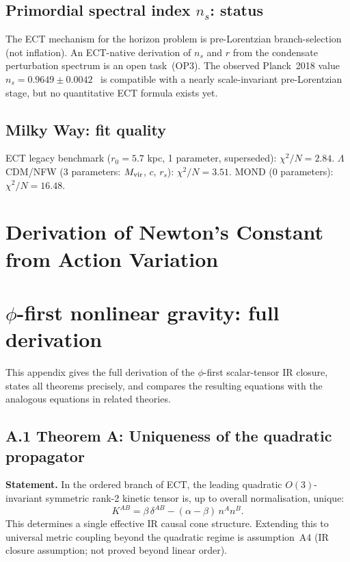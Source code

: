 \documentclass[11pt,a4paper]{article}
\numberwithin{equation}{section}
\begin{document}
\subsection{Primordial spectral index $n_s$: status}
The ECT mechanism for the horizon problem is pre-Lorentzian
branch-selection (not inflation). An ECT-native derivation of
$n_s$ and $r$ from the condensate perturbation spectrum is
an open task~(OP3). The observed Planck~2018 value
$n_s=0.9649\pm0.0042$~\cite{Planck2018} is compatible with
a nearly scale-invariant pre-Lorentzian stage, but no
quantitative ECT formula exists yet.

\subsection{Milky Way: fit
quality}
ECT legacy benchmark ($r_0=5.7$ kpc, 1 parameter, superseded):
$\chi^2/N=2.84$.
$\Lambda$CDM/NFW (3 parameters: $M_{\rm vir}$, $c$, $r_s$):
$\chi^2/N=3.51$. MOND (0 parameters): $\chi^2/N=16.48$.

\section{Derivation of Newton's Constant from Action Variation}
\section{$\phi$-first nonlinear gravity: full derivation}
\label{app:phi_first_EFE}

This appendix gives the full derivation of the $\phi$-first scalar-tensor
IR closure, states all theorems precisely, and compares the resulting
equations with the analogous equations in related theories.

\subsection*{A.1 Theorem A: Uniqueness of the quadratic propagator}

\textbf{Statement.}
In the ordered branch of ECT, the leading quadratic $O(3)$-invariant
symmetric rank-2 kinetic tensor is, up to overall normalisation,
unique:
\begin{equation}
  K^{AB} = \beta\,\delta^{AB} - (\alpha{-}\beta)\,n^An^B.
  \label{eq:K_unique}
\end{equation}
This determines a single effective IR causal cone structure.
Extending this to universal metric coupling beyond the quadratic regime
is assumption~A4 (IR closure assumption; not proved beyond linear order).
\end{document}
